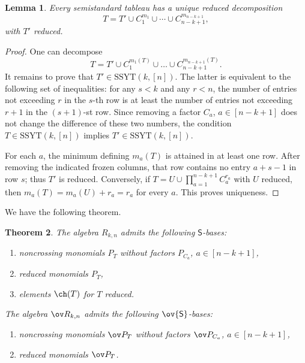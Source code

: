 \documentclass[11pt]{amsart}
\numberwithin{equation}{section}
\newtheorem{thm}{Theorem}[section]
\newtheorem{lem}[thm]{Lemma}
\newcommand{\SSYT}{\mathrm{SSYT}}
\begin{document}
\begin{lem} \label{lem:factorization of semistandard tableau factor out noncyclic frozen}
Every semistandard tableau has a
unique reduced decomposition
\[
T=T'\cup C_1^{m_1}\cup\cdots\cup C_{n-k+1}^{m_{n-k+1}},
\]
with $T'$ reduced.  
\end{lem}
\begin{proof} 
One can decompose
\[
T = T' \cup C_1^{m_1(T)} \cup\dots \cup C_{n-k+1}^{m_{n-k+1}(T)}.
\]
It remains to prove that $T'\in \SSYT(k,[n])$. The latter is equivalent to the following set of
inequalities: for any $s<k$ and any $r<n$, the number of entries not exceeding $r$ in the 
$s$-th row is at least the number of entries not exceeding $r+1$ in the $(s+1)$-st row.
Since removing a factor  $C_a$, $a\in [n-k+1]$ does not change the difference of these two
numbers, the condition $T\in \SSYT(k,[n])$ implies $T'\in \SSYT(k,[n])$.

For each $a$, the minimum defining $m_a(T)$ is attained
in at least one row. After removing the indicated frozen
columns, that row contains no entry $a+s-1$ in row $s$;
thus $T'$ is reduced. Conversely, if
$T=U\cup\prod_{a=1}^{n-k+1}C_a^{r_a}$ with $U$ reduced,
then $m_a(T)=m_a(U)+r_a=r_a$ for every $a$.
This proves uniqueness.
\end{proof}

We have the following theorem.

\begin{thm} \label{thm:5 bases noncyclic case}
The algebra $R_{k,n}$ admits the following
${\mathsf S}$-bases:
\begin{enumerate}
\item noncrossing monomials $P_T$ without factors $P_{C_a}$, $a\in [n-k+1]$,
\item reduced monomials $P_T$,
\item elements $\ch(T)$ for $T$ reduced.
\end{enumerate}    
The algebra $\ov R_{k,n}$ admits the following
$\ov{\mathsf S}$-bases:
\begin{enumerate}
\item noncrossing monomials $\ov P_T$ without factors $\ov P_{C_a}$, $a\in [n-k+1]$,
\item reduced monomials $\ov P_T$.
\end{enumerate}    
\end{thm}
\end{document}
